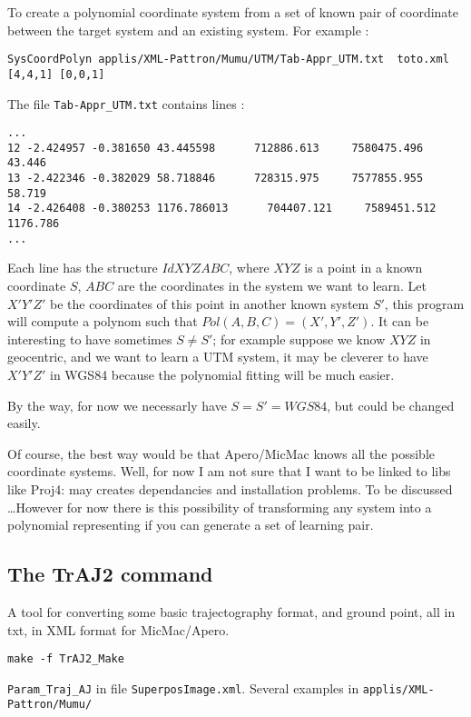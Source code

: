 To create a polynomial coordinate system from a set of known pair of coordinate
between the target system and an existing system. For example :

\begin{verbatim}
SysCoordPolyn applis/XML-Pattron/Mumu/UTM/Tab-Appr_UTM.txt  toto.xml [4,4,1] [0,0,1]
\end{verbatim}

The file {\tt Tab-Appr\_UTM.txt} contains lines :


\begin{verbatim}
...
12 -2.424957 -0.381650 43.445598      712886.613     7580475.496         43.446
13 -2.422346 -0.382029 58.718846      728315.975     7577855.955         58.719
14 -2.426408 -0.380253 1176.786013      704407.121     7589451.512       1176.786
...
\end{verbatim}

Each line has the structure $Id X Y Z A B C$, where $X Y Z$ is a point
in a known coordinate  $S$,  $A B C$ are the coordinates in the system we want to
learn.  Let $X' Y' Z'$ be the coordinates of this point in another known system $S'$, this program will
compute a polynom such that $Pol(A,B,C)=(X',Y',Z')$. It can be interesting to have
sometimes $S \neq S'$; for example suppose we know $X Y Z$ in geocentric,
and we want to learn a UTM system, it may be cleverer to have $X' Y' Z'$ in WGS84
because the polynomial fitting will be much easier.

By the way, for now we necessarly have $S=S'=WGS84$, but could be changed easily.


Of course, the best way would be that Apero/MicMac knows all the possible coordinate systems.
Well, for now I am not sure that I want to be linked to libs like Proj4: may
creates dependancies and installation problems. To be discussed \dots However
for now there is this possibility of transforming any system into a polynomial
representing if you can generate a set of learning pair.


\subsection{The TrAJ2 command}

A tool for converting some basic trajectography format, and ground point,
all in txt, in XML format for MicMac/Apero.


{\tt make -f TrAJ2\_Make}

{\tt Param\_Traj\_AJ} in file {\tt SuperposImage.xml}. Several examples in
{\tt applis/XML-Pattron/Mumu/}



